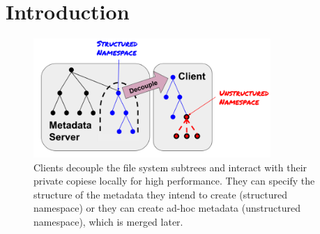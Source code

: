\section{Introduction}
\label{sec:introduction}

\begin{figure}
  \centering
  \includegraphics[width=90mm]{figures/intro.png}
  \caption{Clients decouple the file system subtrees and interact with their
  private copiese locally for high performance. They can specify the structure of
  the metadata they intend to create (structured namespace) or they can create
  ad-hoc metadata (unstructured namespace), which is merged later.\label{fig:intro}}
\end{figure}
